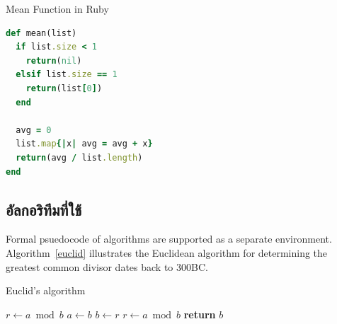 \documentclass[10pt,twocolumn,twoside,a4paper]{article}
\begin{document}
\begin{code}
\caption{Mean Function in Ruby}
\label{rubycode}
\bigskip
\begin{lstlisting}[language=Ruby]
def mean(list)
  if list.size < 1
    return(nil)
  elsif list.size == 1
    return(list[0])
  end

  avg = 0
  list.map{|x| avg = avg + x}
  return(avg / list.length)
end
\end{lstlisting}
\end{code}

\subsection*{อัลกอริทึมที่ใช้}
\label{algorithms}
Formal psuedocode of algorithms are supported as a separate environment.  Algorithm~\ref{euclid} illustrates the Euclidean algorithm for determining the greatest common divisor dates back to 300BC.

\begin{algorithm}[htb]
    \caption{Euclid’s algorithm}
    \label{euclid}
    \begin{algorithmic}[1] %
         
            \State $r\gets a \bmod b$
             
                \State $a \gets b$
                \State $b \gets r$
                \State $r \gets a \bmod b$
            \EndWhile\label{euclidendwhile}
            \State \textbf{return} $b$
        \EndProcedure
    \end{algorithmic}
\end{algorithm}



\vfill
\end{document}
